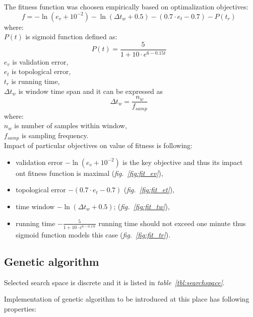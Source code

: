 \documentclass[a4paper,jurnal]{IEEEtran}
\begin{document}
The fitness function was choosen empirically based on optimalization objectives:
\[ f = -\ln(e_v+10^{-2 }) - \ln(\Delta t_w+0.5) - (0.7\cdot e_t-0.7) - P(t_r) \]
where:\\
$ P(t) $ is sigmoid function defined as:
\[ P(t) = \frac{5}{1+10\cdot e^{6-0.15t}} \]
$ e_v $ is validation error,\\
$ e_t $ is topological error,\\
$ t_r $ is running time,\\
$ \Delta t_w $ is window time span and it can be expressed as 
\[  \Delta t_w = \frac{n_w}{f_{samp}}  \]
where:\\
$ n_w $ is number of samples within window,\\
$ f_{samp} $ is sampling frequency.
\\

Impact of particular objectives on value of fitness is following:
\begin{itemize}
	\item validation error $ -\ln(e_v+10^{-2 }) $ is the key objective and thus its impact
	ont fitness function is maximal (\textit{fig.~\ref{fig:fit_ev}}),
	\item topological error $ -(0.7\cdot e_t-0.7) $ (\textit{fig.~\ref{fig:fit_et}}),
	\item time window $ -\ln(\Delta t_w+0.5) $; (\textit{fig.~\ref{fig:fit_tw}}),
	\item running time $ -\frac{5}{1+10\cdot e^{6-0.15t}} $ running
	time should not exceed one minute thus sigmoid function models this case 
	(\textit{fig.~\ref{fig:fit_tr}}).
\end{itemize}

\subsection{Genetic algorithm}
Selected search space is discrete and it is listed  in \textit{table~\ref{tbl:searchspace}}.%

Implementation of genetic algorithm to be introduced at this place
has following properties:
\end{document}
